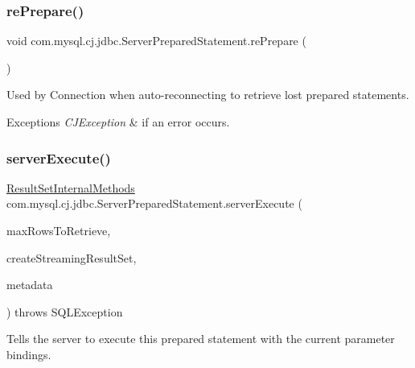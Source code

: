 \subsubsection{\texorpdfstring{re\+Prepare()}{rePrepare()}}
{\footnotesize\ttfamily void com.\+mysql.\+cj.\+jdbc.\+Server\+Prepared\+Statement.\+re\+Prepare (\begin{DoxyParamCaption}{ }\end{DoxyParamCaption})\hspace{0.3cm}{\ttfamily [protected]}}

Used by Connection when auto-\/reconnecting to retrieve \textquotesingle{}lost\textquotesingle{} prepared statements.


\begin{DoxyExceptions}{Exceptions}
{\em C\+J\+Exception} & if an error occurs. \\
\hline
\end{DoxyExceptions}
\mbox{\label{classcom_1_1mysql_1_1cj_1_1jdbc_1_1_server_prepared_statement_a47b5b3c9203f0b52a897ca2fa6537ff2}} 
\subsubsection{\texorpdfstring{server\+Execute()}{serverExecute()}}
{\footnotesize\ttfamily \mbox{\hyperlink{interfacecom_1_1mysql_1_1cj_1_1jdbc_1_1result_1_1_result_set_internal_methods}{Result\+Set\+Internal\+Methods}} com.\+mysql.\+cj.\+jdbc.\+Server\+Prepared\+Statement.\+server\+Execute (\begin{DoxyParamCaption}\item[{int}]{max\+Rows\+To\+Retrieve,  }\item[{boolean}]{create\+Streaming\+Result\+Set,  }\item[{\mbox{\hyperlink{interfacecom_1_1mysql_1_1cj_1_1protocol_1_1_column_definition}{Column\+Definition}}}]{metadata }\end{DoxyParamCaption}) throws S\+Q\+L\+Exception\hspace{0.3cm}{\ttfamily [protected]}}

Tells the server to execute this prepared statement with the current parameter bindings.


